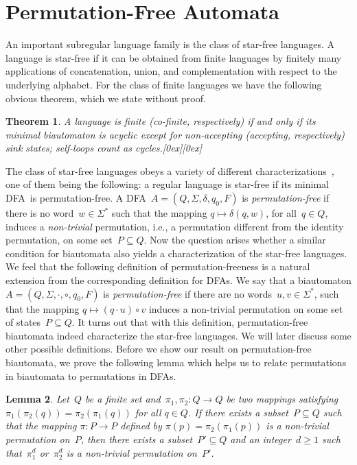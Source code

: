 \documentclass[submission]{eptcs}
\newcommand{\resp}{respectively}
\newcommand{\dfa}{\textrm{DFA}}
\newcommand*{\qed}{\raisebox{0.5ex}[0ex][0ex]{\framebox[1ex][l]{}}}
\newtheorem{theorem}{Theorem}
\newtheorem{lemma}[theorem]{Lemma}
\begin{document}
\section{Permutation-Free Automata}
\label{sec:permutation-free}

An important subregular language family is the class of star-free
languages. A language is star-free if it can be obtained from finite
languages by finitely many applications of concatenation, union, and
complementation with respect to the underlying alphabet.  For the
class of finite languages we have the following obvious theorem, which
we state without proof.

\begin{theorem}
  A language is finite (co-finite, \resp) if and only if its minimal
  biautomaton is acyclic except for non-accepting (accepting, \resp)
  sink states; self-loops count as cycles.\hfill\qed
\end{theorem}

The class of star-free languages obeys a variety of different
characterizations~\cite{McNaPa71}, one of them being the following: a
regular language is star-free if its minimal \dfa\ is
permutation-free.  A \dfa\ $A=(Q,\Sigma,\delta,q_0,F)$ is
\emph{permutation-free} if there is no word~$w\in\Sigma^*$ such that
the mapping $q\mapsto \delta(q,w)$, for all~$q\in Q$, induces a
\emph{non-trivial} permutation, i.e., a permutation different from the
identity permutation, on some set~$P\subseteq Q$.
Now the question arises whether a similar condition for biautomata
also yields a characterization of the star-free languages.  We feel
that the following definition of permutation-freeness is a natural
extension from the corresponding definition for \dfa s.  We say that a
biautomaton $A=(Q,\Sigma,\cdot,\circ,q_0,F)$ is
\emph{permutation-free} if there are no words~$u,v\in\Sigma^*$, such
that the mapping $q\mapsto (q\cdot u)\circ v$ induces a non-trivial
permutation on some set of states~$P\subseteq Q$.  It turns out that
with this definition, permutation-free biautomata indeed characterize
the star-free languages.  We will later discuss some other possible
definitions.  Before we show our result on permutation-free
biautomata, we prove the following lemma which helps us to relate
permutations in biautomata to permutations in \dfa s.

\begin{lemma}\label{lem:permutation-lemma}
  Let~$Q$ be a finite set and~$\pi_1,\pi_2\colon Q\to Q$ be two
  mappings satisfying $\pi_1(\pi_2(q)) = \pi_2(\pi_1(q))$ for all
  $q\in Q$.  If there exists a subset~$P\subseteq Q$ such that the
  mapping $\pi\colon P\to P$ defined by $\pi(p) = \pi_2(\pi_1(p))$ is
  a non-trivial permutation on~$P$, then there exists a
  subset~$P'\subseteq Q$ and an integer~$d\geq 1$ such that~$\pi_1^d$
  or~$\pi_2^d$ is a non-trivial permutation on~$P'$.
\end{lemma}
\end{document}
